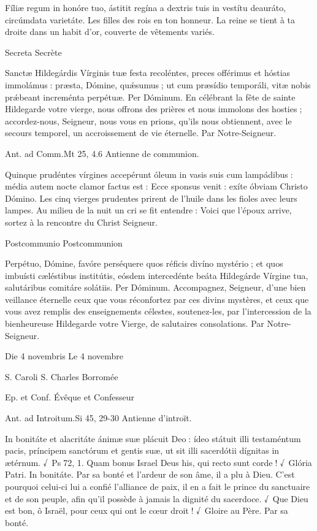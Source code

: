 \begin{paracol}{2}
Fíliæ regum in honóre tuo, ástitit regína a dextris tuis in vestítu deauráto, circúmdata varietáte.
\switchcolumn
Les filles des rois en ton honneur. La reine se tient à ta droite dans un habit d’or, couverte de vêtements variés.
\switchcolumn*

Secreta
\switchcolumn
Secrète
\switchcolumn*

Sanctæ Hildegárdis Vírginis tuæ  festa recoléntes, preces offérimus et hóstias immolámus : præsta, Dómine, quǽsumus ; ut cum præsídio temporáli, vitæ nobis prǽbeant increménta perpétuæ. Per Dóminum.
\switchcolumn
En célébrant la fête de sainte Hildegarde  votre vierge, nous offrons des prières et nous immolons des hosties ; accordez-nous, Seigneur, nous vous en prions, qu’ils nous obtiennent, avec le secours temporel, un accroissement de vie éternelle. Par Notre-Seigneur.
\switchcolumn*

Ant. ad Comm.\hfill Mt 25, 4.6
\switchcolumn
Antienne de communion.
\switchcolumn*

Quinque prudéntes vírgines accepérunt óleum in vasis suis cum lampádibus : média autem nocte clamor factus est : Ecce sponsus venit : exíte óbviam Christo Dómino.
\switchcolumn
Les cinq vierges prudentes prirent de l’huile dans les fioles avec leurs lampes. Au milieu de la nuit un cri se fit entendre : Voici que l’époux arrive, sortez à la rencontre du Christ Seigneur.
\switchcolumn*

Postcommunio
\switchcolumn
Postcommunion
\switchcolumn*

Perpétuo, Dómine, favóre perséquere  quos réficis divíno mystério ; et quos imbuísti cæléstibus institútis, eósdem intercedénte beáta Hildegárde Vírgine tua, salutáribus comitáre solátiis. Per Dóminum.
\switchcolumn
Accompagnez, Seigneur, d’une bien veillance éternelle ceux que vous réconfortez par ces divins mystères, et ceux que vous avez remplis des enseignements célestes, soutenez-les, par l’intercession de la bienheureuse Hildegarde votre Vierge, de salutaires consolations. Par Notre-Seigneur.
\switchcolumn*

Die 4 novembris
\switchcolumn
Le 4 novembre
\switchcolumn*

S. Caroli
\switchcolumn
S. Charles Borromée
\switchcolumn*

Ep. et Conf.
\switchcolumn
Évêque et Confesseur
\switchcolumn*

Ant. ad Introitum.\hfill Si 45, 29-30
\switchcolumn
Antienne d’introït.
\switchcolumn*

In bonitáte et alacritáte ánimæ  suæ plácuit Deo : ídeo státuit illi testaméntum pacis, príncipem sanctórum et gentis suæ, ut sit illi sacerdótii dígnitas in ætérnum. √~Ps 72, 1. Quam bonus Israel Deus his, qui recto sunt corde ! √~Glória Patri. In bonitáte.
\switchcolumn
Par sa bonté et l’ardeur de son âme, il a  plu à Dieu. C’est pourquoi celui-ci lui a confié l’alliance de paix, il en a fait le prince du sanctuaire et de son peuple, afin qu’il possède à jamais la dignité du sacerdoce. √~Que Dieu est bon, ô Israël, pour ceux qui ont le cœur droit ! √~Gloire au Père. Par sa bonté.
\switchcolumn*


\end{paracol}
